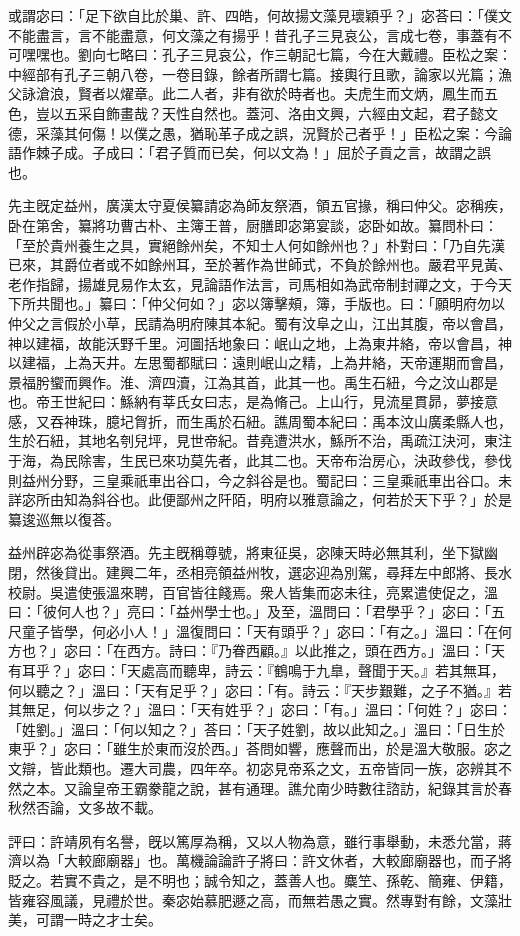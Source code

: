 \begin{pinyinscope}
或謂宓曰：「足下欲自比於巢、許、四皓，何故揚文藻見瓌穎乎？」宓荅曰：「僕文不能盡言，言不能盡意，何文藻之有揚乎！昔孔子三見哀公，言成七卷，事蓋有不可嘿嘿也。劉向七略曰：孔子三見哀公，作三朝記七篇，今在大戴禮。臣松之案：中經部有孔子三朝八卷，一卷目錄，餘者所謂七篇。接輿行且歌，論家以光篇；漁父詠滄浪，賢者以燿章。此二人者，非有欲於時者也。夫虎生而文炳，鳳生而五色，豈以五采自飾畫哉？天性自然也。蓋河、洛由文興，六經由文起，君子懿文德，采藻其何傷！以僕之愚，猶恥革子成之誤，況賢於己者乎！」臣松之案：今論語作棘子成。子成曰：「君子質而已矣，何以文為！」屈於子貢之言，故謂之誤也。

先主旣定益州，廣漢太守夏侯纂請宓為師友祭酒，領五官掾，稱曰仲父。宓稱疾，卧在第舍，纂將功曹古朴、主簿王普，厨膳即宓第宴談，宓卧如故。纂問朴曰：「至於貴州養生之具，實絕餘州矣，不知士人何如餘州也？」朴對曰：「乃自先漢已來，其爵位者或不如餘州耳，至於著作為世師式，不負於餘州也。嚴君平見黃、老作指歸，揚雄見易作太玄，見論語作法言，司馬相如為武帝制封禪之文，于今天下所共聞也。」纂曰：「仲父何如？」宓以簿擊頰，簿，手版也。曰：「願明府勿以仲父之言假於小草，民請為明府陳其本紀。蜀有汶阜之山，江出其腹，帝以會昌，神以建福，故能沃野千里。河圖括地象曰：岷山之地，上為東井絡，帝以會昌，神以建福，上為天井。左思蜀都賦曰：遠則岷山之精，上為井絡，天帝運期而會昌，景福肹蠁而興作。淮、濟四瀆，江為其首，此其一也。禹生石紐，今之汶山郡是也。帝王世紀曰：鯀納有莘氏女曰志，是為脩己。上山行，見流星貫昴，夢接意感，又吞神珠，臆圮胷折，而生禹於石紐。譙周蜀本紀曰：禹本汶山廣柔縣人也，生於石紐，其地名刳兒坪，見世帝紀。昔堯遭洪水，鯀所不治，禹疏江決河，東注于海，為民除害，生民已來功莫先者，此其二也。天帝布治房心，決政參伐，參伐則益州分野，三皇乘祇車出谷口，今之斜谷是也。蜀記曰：三皇乘祇車出谷口。未詳宓所由知為斜谷也。此便鄙州之阡陌，明府以雅意論之，何若於天下乎？」於是纂逡巡無以復荅。

益州辟宓為從事祭酒。先主旣稱尊號，將東征吳，宓陳天時必無其利，坐下獄幽閉，然後貸出。建興二年，丞相亮領益州牧，選宓迎為別駕，尋拜左中郎將、長水校尉。吳遣使張溫來聘，百官皆往餞焉。衆人皆集而宓未往，亮累遣使促之，溫曰：「彼何人也？」亮曰：「益州學士也。」及至，溫問曰：「君學乎？」宓曰：「五尺童子皆學，何必小人！」溫復問曰：「天有頭乎？」宓曰：「有之。」溫曰：「在何方也？」宓曰：「在西方。詩曰：『乃眷西顧。』以此推之，頭在西方。」溫曰：「天有耳乎？」宓曰：「天處高而聽卑，詩云：『鶴鳴于九臯，聲聞于天。』若其無耳，何以聽之？」溫曰：「天有足乎？」宓曰：「有。詩云：『天步艱難，之子不猶。』若其無足，何以步之？」溫曰：「天有姓乎？」宓曰：「有。」溫曰：「何姓？」宓曰：「姓劉。」溫曰：「何以知之？」荅曰：「天子姓劉，故以此知之。」溫曰：「日生於東乎？」宓曰：「雖生於東而沒於西。」荅問如響，應聲而出，於是溫大敬服。宓之文辯，皆此類也。遷大司農，四年卒。初宓見帝系之文，五帝皆同一族，宓辨其不然之本。又論皇帝王霸豢龍之說，甚有通理。譙允南少時數往諮訪，紀錄其言於春秋然否論，文多故不載。

評曰：許靖夙有名譽，旣以篤厚為稱，又以人物為意，雖行事舉動，未悉允當，蔣濟以為「大較廊廟器」也。萬機論論許子將曰：許文休者，大較廊廟器也，而子將貶之。若實不貴之，是不明也；誠令知之，蓋善人也。麋笁、孫乾、簡雍、伊籍，皆雍容風議，見禮於世。秦宓始慕肥遯之高，而無若愚之實。然專對有餘，文藻壯美，可謂一時之才士矣。


\end{pinyinscope}